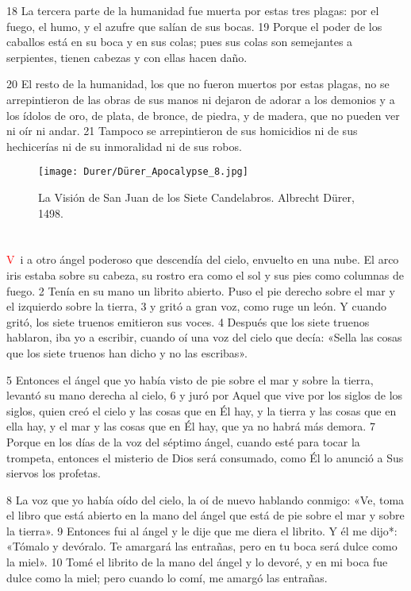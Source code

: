 \documentclass[12pt,twocolumn,twoside]{book}
\begin{document}
18 La tercera parte de la humanidad fue muerta por estas tres plagas: por el fuego, el humo, y el azufre que salían de sus bocas. 19 Porque el poder de los caballos está en su boca y en sus colas; pues sus colas son semejantes a serpientes, tienen cabezas y con ellas hacen daño.

20 El resto de la humanidad, los que no fueron muertos por estas plagas, no se arrepintieron de las obras de sus manos ni dejaron de adorar a los demonios y a los ídolos de oro, de plata, de bronce, de piedra, y de madera, que no pueden ver ni oír ni andar. 21 Tampoco se arrepintieron de sus homicidios ni de sus hechicerías ni de su inmoralidad ni de sus robos.
\begin{figure*}[p!]
	\centering
       \texttt{[image: Durer/Dürer\_Apocalypse\_8.jpg]}    
    	\caption{La Visión de San Juan de los Siete Candelabros. Albrecht Dürer, 1498.}
\end{figure*}
\chapter{}
\lettrine[lines=4,slope=-.5em]{\textcolor{red}{V}}{\ }i a otro ángel poderoso que descendía del cielo, envuelto en una nube. El arco iris estaba sobre su cabeza, su rostro era como el sol y sus pies como columnas de fuego. 2 Tenía en su mano un librito abierto. Puso el pie derecho sobre el mar y el izquierdo sobre la tierra, 3 y gritó a gran voz, como ruge un león. Y cuando gritó, los siete truenos emitieron sus voces. 4 Después que los siete truenos hablaron, iba yo a escribir, cuando oí una voz del cielo que decía: «Sella las cosas que los siete truenos han dicho y no las escribas».

5 Entonces el ángel que yo había visto de pie sobre el mar y sobre la tierra, levantó su mano derecha al cielo, 6 y juró por Aquel que vive por los siglos de los siglos, quien creó el cielo y las cosas que en Él hay, y la tierra y las cosas que en ella hay, y el mar y las cosas que en Él hay, que ya no habrá más demora. 7 Porque en los días de la voz del séptimo ángel, cuando esté para tocar la trompeta, entonces el misterio de Dios será consumado, como Él lo anunció a Sus siervos los profetas.

8 La voz que yo había oído del cielo, la oí de nuevo hablando conmigo: «Ve, toma el libro que está abierto en la mano del ángel que está de pie sobre el mar y sobre la tierra». 9 Entonces fui al ángel y le dije que me diera el librito. Y él me dijo*: «Tómalo y devóralo. Te amargará las entrañas, pero en tu boca será dulce como la miel». 10 Tomé el librito de la mano del ángel y lo devoré, y en mi boca fue dulce como la miel; pero cuando lo comí, me amargó las entrañas.
\end{document}

